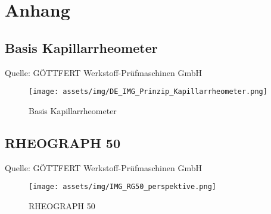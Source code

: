 \setcounter{chapter}{23}
\chapter{Anhang}

\section{Basis Kapillarrheometer}
Quelle: GÖTTFERT Werkstoff-Prüfmaschinen GmbH
\begin{figure}[ht]
    \begin{center}
        \texttt{[image: assets/img/DE\_IMG\_Prinzip\_Kapillarrheometer.png]}
        \caption{Basis Kapillarrheometer}
        \label{base_capillary_rheometer}
    \end{center}
\end{figure}
\clearpage

\section{RHEOGRAPH 50}
Quelle: GÖTTFERT Werkstoff-Prüfmaschinen GmbH
\begin{figure}[ht]
    \begin{center}
        \texttt{[image: assets/img/IMG\_RG50\_perspektive.png]}
        \caption{RHEOGRAPH 50}
        \label{rg50}
    \end{center}
\end{figure}
\clearpage

